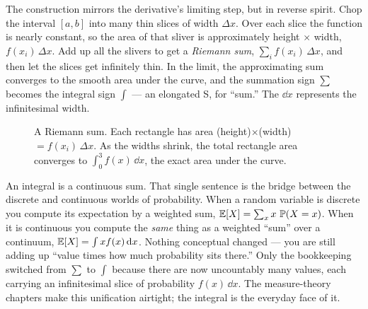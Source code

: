 The construction mirrors the derivative's limiting step, but in reverse spirit. Chop the interval
$[a,b]$ into many thin slices of width $\Delta x$. Over each slice the function is nearly constant, so
the area of that sliver is approximately height $\times$ width, $f(x_i)\,\Delta x$. Add up all the
slivers to get a \emph{Riemann sum}, $\sum_i f(x_i)\,\Delta x$, and then let the slices get
infinitely thin. In the limit, the approximating sum converges to the smooth area under the
curve, and the summation sign $\sum$ becomes the integral sign $\int$ --- an elongated S, for
``sum.'' The $\dd x$ represents the infinitesimal width.

\begin{figure}[H]
\centering
{}
\caption{A Riemann sum. Each rectangle has area (height)$\times$(width)$=f(x_i)\,\Delta x$. As the
widths shrink, the total rectangle area converges to $\int_0^3 f(x)\,\dd x$, the exact area under the
curve.}
\label{chAcla:fig-riemann}
\end{figure}

\begin{happeningbox}
An integral is a continuous sum. That single sentence is the bridge between the discrete and
continuous worlds of probability. When a random variable is discrete you compute its expectation by a
weighted sum, $\operatorname{\mathbb{E}}[X]=\sum_x x\,\operatorname{\mathbb{P}}(X=x)$. When it is continuous you compute the \emph{same} thing as a
weighted ``sum'' over a continuum, $\operatorname{\mathbb{E}}[X]=\int x f(x)\,\mathrm{d} x$. Nothing conceptual changed --- you are
still adding up ``value times how much probability sits there.'' Only the bookkeeping switched from
$\sum$ to $\int$ because there are now uncountably many values, each carrying an infinitesimal slice
of probability $f(x)\,\dd x$. The measure-theory chapters make this unification airtight; the integral
is the everyday face of it.
\end{happeningbox}

